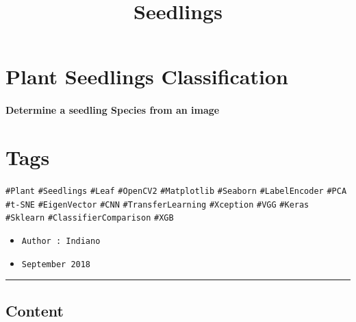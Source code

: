 \documentclass[11pt]{article}
\title{Seedlings}
\providecommand{\tightlist}{%
      \setlength{\itemsep}{0pt}\setlength{\parskip}{0pt}}
\begin{document}
    
    
    \maketitle
    
    

    
    \hypertarget{plant-seedlings-classification}{%
\section{Plant Seedlings
Classification}\label{plant-seedlings-classification}}

\hypertarget{determine-a-seedling-species-from-an-image}{%
\paragraph{Determine a seedling Species from an
image}\label{determine-a-seedling-species-from-an-image}}

    \hypertarget{tags}{%
\section{Tags}\label{tags}}

\texttt{\#Plant} \texttt{\#Seedlings} \texttt{\#Leaf} \texttt{\#OpenCV2}
\texttt{\#Matplotlib} \texttt{\#Seaborn} \texttt{\#LabelEncoder}
\texttt{\#PCA} \texttt{\#t-SNE} \texttt{\#EigenVector} \texttt{\#CNN}
\texttt{\#TransferLearning} \texttt{\#Xception} \texttt{\#VGG}
\texttt{\#Keras} \texttt{\#Sklearn} \texttt{\#ClassifierComparison}
\texttt{\#XGB}

    \begin{itemize}
\tightlist
\item
  \texttt{Author\ :\ Indiano}
\item
  \texttt{September\ 2018}
\end{itemize}

\begin{center}\rule{0.5\linewidth}{\linethickness}\end{center}

\hypertarget{content}{%
\subsection{Content}\label{content}}
\end{document}
